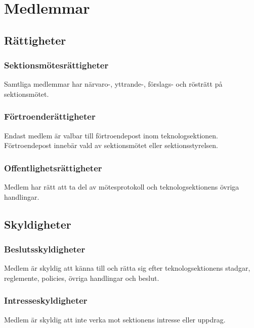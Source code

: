 \section{Medlemmar}

\subsection{Rättigheter}

\subsubsection{Sektionsmötesrättigheter}
Samtliga medlemmar har närvaro-, yttrande-, förslags- och rösträtt på sektionsmötet.

\subsubsection{Förtroenderättigheter}
Endast medlem är valbar till förtroendepost inom teknologsektionen. Förtroendepost innebär vald av sektionsmötet eller sektionsstyrelsen.

\subsubsection{Offentlighetsrättigheter}
Medlem har rätt att ta del av mötesprotokoll och teknologsektionens övriga handlingar.

\subsection{Skyldigheter}

\subsubsection{Beslutsskyldigheter}
Medlem är skyldig att känna till och rätta sig efter teknologsektionens stadgar, reglemente, policies, övriga handlingar och beslut.

\subsubsection{Intresseskyldigheter}
Medlem är skyldig att inte verka mot sektionens intresse eller uppdrag.

